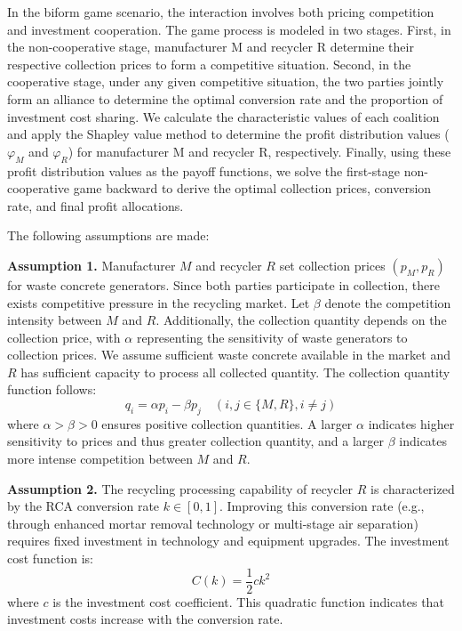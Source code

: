 \documentclass[authoryear,preprint,review,times,10pt]{elsarticle}
\begin{document}
In the biform game scenario, the interaction involves both pricing competition and investment cooperation. The game process is modeled in two stages. First, in the non-cooperative stage, manufacturer M and recycler R determine their respective collection prices to form a competitive situation. Second, in the cooperative stage, under any given competitive situation, the two parties jointly form an alliance to determine the optimal conversion rate and the proportion of investment cost sharing. We calculate the characteristic values of each coalition and apply the Shapley value method to determine the profit distribution values ($\varphi_M$ and $\varphi_R$) for manufacturer M and recycler R, respectively. Finally, using these profit distribution values as the payoff functions, we solve the first-stage non-cooperative game backward to derive the optimal collection prices, conversion rate, and final profit allocations.

The following assumptions are made:

\textbf{Assumption 1.} Manufacturer $M$ and recycler $R$ set collection prices $(p_M, p_R)$ for waste concrete generators. Since both parties participate in collection, there exists competitive pressure in the recycling market. Let $\beta$ denote the competition intensity between $M$ and $R$. Additionally, the collection quantity depends on the collection price, with $\alpha$ representing the sensitivity of waste generators to collection prices. We assume sufficient waste concrete available in the market and $R$ has sufficient capacity to process all collected quantity. The collection quantity function follows:
\begin{equation}
q_i = \alpha p_i - \beta p_j \quad (i,j \in \{M, R\}, i \neq j)
\end{equation}
where $\alpha > \beta > 0$ ensures positive collection quantities. A larger $\alpha$ indicates higher sensitivity to prices and thus greater collection quantity, and a larger $\beta$ indicates more intense competition between $M$ and $R$.

\textbf{Assumption 2.} The recycling processing capability of recycler $R$ is characterized by the RCA conversion rate $k \in [0,1]$. Improving this conversion rate (e.g., through enhanced mortar removal technology or multi-stage air separation) requires fixed investment in technology and equipment upgrades. The investment cost function is:
\begin{equation}
C(k) = \frac{1}{2} c k^2
\end{equation}
where $c$ is the investment cost coefficient. This quadratic function indicates that investment costs increase with the conversion rate.
\end{document}
